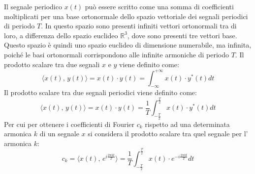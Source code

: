 \documentclass{article}
\numberwithin{equation}{subsection}
\begin{document}
Il segnale periodico $x(t)$ può essere scritto come una somma di coefficienti moltiplicati per una base ortonormale dello spazio vettoriale dei segnali periodici di periodo 
$T$. In questo spazio sono presenti infiniti vettori ortonormali tra di loro, a differenza dello spazio euclideo $\mathbb{R}^3$, dove sono presenti tre vettori base. Questo 
spazio è quindi uno spazio euclideo di dimensione numerabile, ma infinita, poiché le basi ortonormali corrispondono alle infinite armoniche di periodo $T$. 
Il prodotto scalare tra due segnali $x$ e $y$ viene definito come:
\begin{equation*}
    \langle x(t),\,y(t)\rangle=x(t)\cdot y(t)=\displaystyle\int_{-\infty}^{+\infty}x(t)\cdot y^*(t)dt
\end{equation*}
Il prodotto scalare tra due segnali periodici viene definito come:
\begin{equation*}
    \langle x(t),\,y(t)\rangle=x(t)\cdot y(t)=\displaystyle\frac{1}{T}\int_{-\frac{T}{2}}^{\frac{T}{2}}x(t)\cdot y^*(t)dt
\end{equation*}
Per cui per ottenere i coefficienti di Fourier $c_k$ rispetto ad una determinata armonica $k$ di un segnale $x$ si considera il prodotto scalare tra quel segnale per l'
armonica $k$:
\begin{equation*}
    c_k=\langle x(t),\,e^{i\frac{2\pi  k t}{T}}\rangle=\displaystyle\frac{1}{T}\int_{-\frac{T}{2}}^{\frac{T}{2}}x(t)\cdot e^{-i\frac{2\pi  k t}{T}}dt
\end{equation*} 
\end{document}
